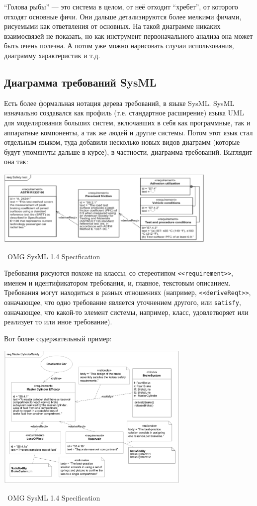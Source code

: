 \documentclass[a5paper]{article}
\newcommand{\attribution}[1] {
    \vspace{-4mm}\begin{flushright}\begin{scriptsize}%
    {\textcopyright\, #1}\end{scriptsize}\end{flushright}
}
\begin{document}
``Голова рыбы'' --- это система в целом, от неё отходит ``хребет'', от которого отходят основные фичи. Они дальше детализируются более мелкими фичами, рисуемыми как ответвления от основных. На такой диаграмме никаких взаимосвязей не показать, но как инструмент первоначального анализа она может быть очень полезна. А потом уже можно нарисовать случаи использования, диаграмму характеристик и т.д.

\subsection{Диаграмма требований SysML}

Есть более формальная нотация дерева требований, в языке SysML. SysML изначально создавался как профиль (т.е. стандартное расширение) языка UML для моделирования больших систем, включавших в себя как программные, так и аппаратные компоненты, а так же людей и другие системы. Потом этот язык стал отдельным языком, туда добавили несколько новых видов диаграмм (которые будут упомянуты дальше в курсе), в частности, диаграмма требований. Выглядит она так:

\begin{center}
    \includegraphics[width=0.8\textwidth]{sysMlRequirementDiagram.png}
    \attribution{OMG SysML 1.4 Specification}
\end{center}

Требования рисуются похоже на классы, со стереотипом \verb|<<requirement>>|, именем и идентификатором требования, и, главное, текстовым описанием. Требования могут находиться в разных отношениях (например, \verb|<<deriveReqt>>|, означающее, что одно требование является уточнением другого, или \verb|satisfy|, означающее, что какой-то элемент системы, например, класс, удовлетворяет или реализует то или иное требование).

Вот более содержательный пример:

\begin{center}
    \includegraphics[width=0.7\textwidth]{sysMlRequirementsExample.png}
    \attribution{OMG SysML 1.4 Specification}
\end{center}
\end{document}

